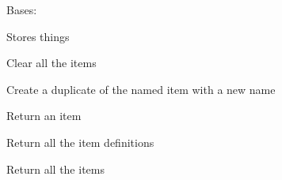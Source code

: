 \documentclass[letterpaper,10pt,english]{sphinxmanual}
\begin{document}
\begin{fulllineitems}
\label{common:serge.registry.GeneralStore}
Bases: {\hyperref[common:serge.serialize.Serializable]{}}

Stores things

\begin{fulllineitems}
\label{common:serge.registry.GeneralStore.clearItems}
Clear all the items

\end{fulllineitems}


\begin{fulllineitems}
\label{common:serge.registry.GeneralStore.duplicateItem}
Create a duplicate of the named item with a new name

\end{fulllineitems}


\begin{fulllineitems}
\label{common:serge.registry.GeneralStore.getItem}
Return an item

\end{fulllineitems}


\begin{fulllineitems}
\label{common:serge.registry.GeneralStore.getItemDefinitions}
Return all the item definitions

\end{fulllineitems}


\begin{fulllineitems}
\label{common:serge.registry.GeneralStore.getItems}
Return all the items

\end{fulllineitems}


\end{fulllineitems}
\end{document}
